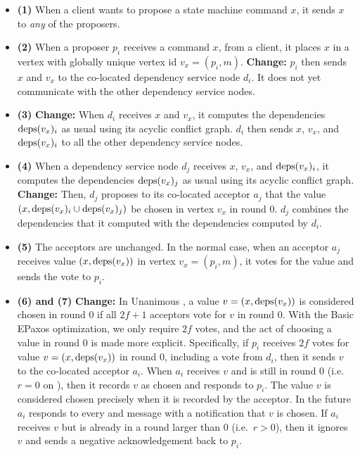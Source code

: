 \begin{itemize}
  \item \textbf{(1)}
    When a client wants to propose a state machine command $x$, it sends $x$ to
    \emph{any} of the proposers.

  \item \textbf{(2)}
    When a proposer $p_i$ receives a command $x$, from a client, it places $x$
    in a vertex with globally unique vertex id $v_x = (p_i, m)$.
    \textbf{Change:} $p_i$ then sends $x$ and $v_x$ to the co-located
    dependency service node $d_i$. It does not yet communicate with the other
    dependency service nodes.

  \item \textbf{(3)}
    \textbf{Change:} When $d_i$ receives $x$ and $v_x$, it computes the
    dependencies $\text{deps}(v_x)_i$ as usual using its acyclic conflict graph.
    $d_i$ then sends $x$, $v_x$, and $\text{deps}(v_x)_i$ to all the other dependency
    service nodes.

  \item \textbf{(4)}
    When a dependency service node $d_j$ receives $x$, $v_x$, and
    $\text{deps}(v_x)_i$, it computes the dependencies $\text{deps}(v_x)_j$ as usual using
    its acyclic conflict graph. \textbf{Change:} Then, $d_j$ proposes to its
    co-located acceptor $a_j$ that the value $(x, \text{deps}(v_x)_i \cup
    \text{deps}(v_x)_j)$ be chosen in vertex $v_x$ in round $0$. $d_j$ combines the
    dependencies that it computed with the dependencies computed by $d_i$.

  \item \textbf{(5)}
    The acceptors are unchanged. In the normal case, when an acceptor $a_j$
    receives value $(x, \text{deps}(v_x))$ in vertex $v_x = (p_i, m)$, it votes for
    the value and sends the vote to $p_i$.

  \item \textbf{(6) and (7)}
    \textbf{Change:} In Unanimous \BPaxos{}, a value $v = (x, \text{deps}(v_x))$ is
    considered chosen in round $0$ if all $2f+1$ acceptors vote for $v$ in
    round $0$. With the Basic EPaxos optimization, we only require $2f$ votes,
    and the act of choosing a value in round $0$ is made more explicit.
    Specifically, if $p_i$ receives $2f$ votes for value $v = (x, \text{deps}(v_x))$
    in round $0$, including a vote from $d_i$, then it sends $v$ to the
    co-located acceptor $a_i$. When $a_i$ receives $v$ and is still in round
    $0$ (i.e.\ $r = 0$ on  ),
    then it records $v$ as chosen and responds to $p_i$. The value $v$ is
    considered chosen precisely when it is recorded by the acceptor. In the
    future $a_i$ responds to every  and 
    message with a notification that $v$ is chosen. If $a_i$ receives $v$ but
    is already in a round larger than $0$ (i.e.\ $r > 0$), then it ignores $v$
    and sends a negative acknowledgement back to $p_i$.


\end{itemize}
